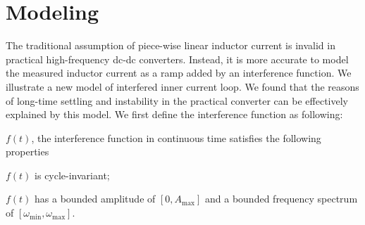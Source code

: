 \section{Modeling} \label{sec:modeling}


The traditional assumption of piece-wise linear inductor current is invalid in practical high-frequency dc-dc converters. Instead, it is more accurate to model the measured inductor current as a ramp added by an interference function.
We illustrate a new model of interfered inner current loop. We found that the reasons of long-time settling and instability in the practical converter can be effectively explained by this model. We first define the interference function as following: 
\begin{definition}
$f(t)$, the interference function in continuous time satisfies the following properties \begin{enumerate*} [label=(\roman*)]  \item $f(t)$ is cycle-invariant; \item $f(t)$ has a bounded amplitude of $[0, A_{\text{max}}]$ and a bounded frequency spectrum of $[\omega_{\text{min}}, \omega_{\text{max}}]$.
\end{enumerate*} 
\end{definition}


